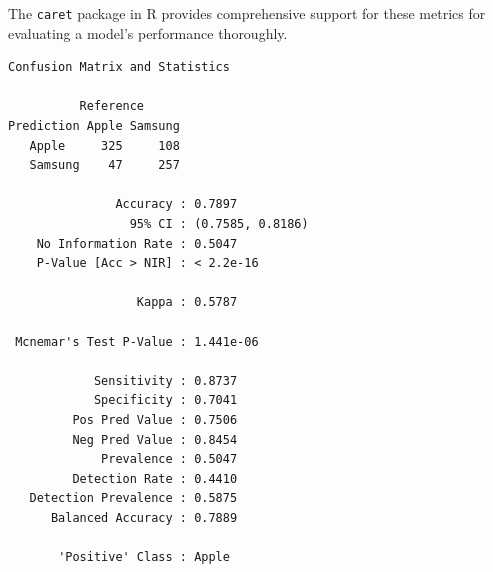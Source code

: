 The \texttt{caret} package in R provides comprehensive support for these
metrics for evaluating a model's performance thoroughly.

\begin{Shaded}
\begin{Highlighting}[]
\OtherTok{\textless{}{-}} \SpecialCharTok{$}
\end{Highlighting}
\end{Shaded}

\begin{verbatim}
Confusion Matrix and Statistics

          Reference
Prediction Apple Samsung
   Apple     325     108
   Samsung    47     257
                                          
               Accuracy : 0.7897          
                 95% CI : (0.7585, 0.8186)
    No Information Rate : 0.5047          
    P-Value [Acc > NIR] : < 2.2e-16       
                                          
                  Kappa : 0.5787          
                                          
 Mcnemar's Test P-Value : 1.441e-06       
                                          
            Sensitivity : 0.8737          
            Specificity : 0.7041          
         Pos Pred Value : 0.7506          
         Neg Pred Value : 0.8454          
             Prevalence : 0.5047          
         Detection Rate : 0.4410          
   Detection Prevalence : 0.5875          
      Balanced Accuracy : 0.7889          
                                          
       'Positive' Class : Apple           
                                          
\end{verbatim}

\begin{Shaded}
\begin{Highlighting}[]
\OtherTok{\textless{}{-}}  \NormalTok{)}

\NormalTok{(}\SpecialCharTok{*} \NormalTok{, }\NormalTok{))}
\end{Highlighting}
\end{Shaded}

